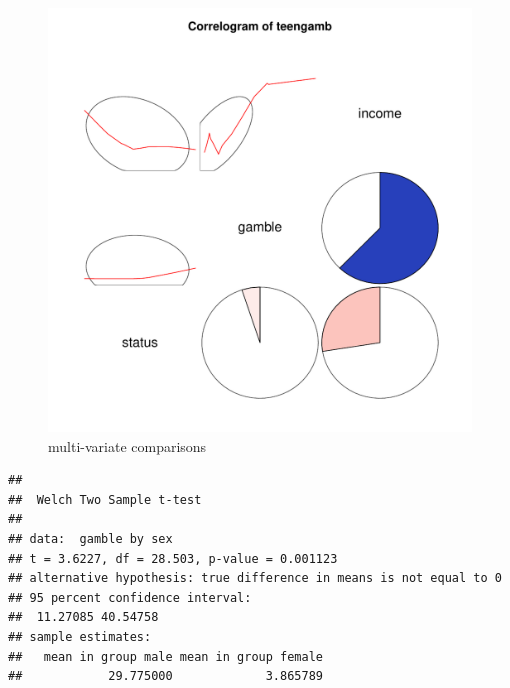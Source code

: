 \documentclass{article}\usepackage[]{graphicx}\usepackage[]{color}
\makeatletter
\def\maxwidth{ %
  \ifdim\Gin@nat@width>\linewidth
    \linewidth
  \else
    \Gin@nat@width
  \fi
}
\newenvironment{kframe}{%
 \def\at@end@of@kframe{}%
 \ifinner\ifhmode%
  \def\at@end@of@kframe{\end{minipage}}%
  \begin{minipage}{\columnwidth}%
 \fi\fi%
 \def\FrameCommand##1{\hskip\@totalleftmargin \hskip-\fboxsep
 \colorbox{shadecolor}{##1}\hskip-\fboxsep
     \hskip-\linewidth \hskip-\@totalleftmargin \hskip\columnwidth}%
 \MakeFramed {\advance\hsize-\width
   \@totalleftmargin\z@ \linewidth\hsize
   \@setminipage}}%
 {\par\unskip\endMakeFramed%
 \at@end@of@kframe}
\newenvironment{knitrout}{}{} %
\makeatother
\begin{document}
\begin{knitrout}
\color{fgcolor}\begin{figure}
\includegraphics[width=\maxwidth]{figure/corrgram-1} \caption[multi-variate comparisons]{multi-variate comparisons}\label{fig:corrgram}
\end{figure}


\end{knitrout}


\begin{knitrout}
\color{fgcolor}\begin{kframe}
\begin{verbatim}
## 
## 	Welch Two Sample t-test
## 
## data:  gamble by sex
## t = 3.6227, df = 28.503, p-value = 0.001123
## alternative hypothesis: true difference in means is not equal to 0
## 95 percent confidence interval:
##  11.27085 40.54758
## sample estimates:
##   mean in group male mean in group female 
##            29.775000             3.865789
\end{verbatim}
\end{kframe}
\end{knitrout}
\end{document}
